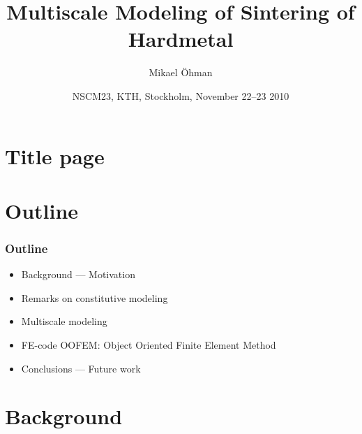 \documentclass[11pt,mathserif]{beamer}
\title{Multiscale Modeling of Sintering of Hardmetal}
\author{Mikael Öhman}
\institute{Dept. of Applied Mechanics\\ Chalmers University of Technology}
\date{NSCM23, KTH, Stockholm, November 22--23 2010}
\newcommand{\roughcite}[1]{\textit{#1}}
\begin{document}
\section{Title page}
\begin{frame}[plain]
 \titlepage
\end{frame}

\section{Outline}
\begin{frame}
 \frametitle{Outline}

\begin{itemize}
 \item Background --- Motivation
 \item Remarks on constitutive modeling
 \item Multiscale modeling
 \item FE-code OOFEM: Object Oriented Finite Element Method
 \item Conclusions --- Future work
\end{itemize}
\end{frame}

\section{Background}
% 
% 
\end{document}
